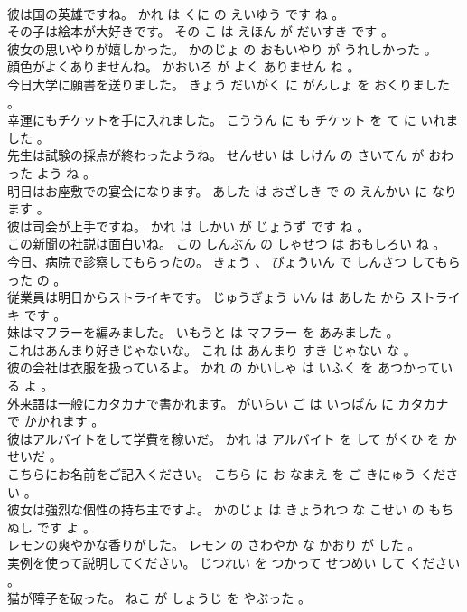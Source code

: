 \documentclass[8pt]{extreport}
\begin{document}
\begin{CJK}{UTF8}{min}
\\	彼は国の英雄ですね。	かれ は くに の えいゆう です ね 。 
\\	その子は絵本が大好きです。	その こ は えほん が だいすき です 。 
\\	彼女の思いやりが嬉しかった。	かのじょ の おもいやり が うれしかった 。 
\\	顔色がよくありませんね。	かおいろ が よく ありません ね 。 
\\	今日大学に願書を送りました。	きょう だいがく に がんしょ を おくりました 。 
\\	幸運にもチケットを手に入れました。	こううん に も チケット を て に いれました 。 
\\	先生は試験の採点が終わったようね。	せんせい は しけん の さいてん が おわった よう ね 。 
\\	明日はお座敷での宴会になります。	あした は おざしき で の えんかい に なります 。 
\\	彼は司会が上手ですね。	かれ は しかい が じょうず です ね 。 
\\	この新聞の社説は面白いね。	この しんぶん の しゃせつ は おもしろい ね 。 
\\	今日、病院で診察してもらったの。	きょう 、 びょういん で しんさつ してもらった の 。 
\\	従業員は明日からストライキです。	じゅうぎょう いん は あした から ストライキ です 。 
\\	妹はマフラーを編みました。	いもうと は マフラー を あみました 。 
\\	これはあんまり好きじゃないな。	これ は あんまり すき じゃない な 。 
\\	彼の会社は衣服を扱っているよ。	かれ の かいしゃ は いふく を あつかっている よ 。 
\\	外来語は一般にカタカナで書かれます。	がいらい ご は いっぱん に カタカナ で かかれます 。 
\\	彼はアルバイトをして学費を稼いだ。	かれ は アルバイト を して がくひ を かせいだ 。 
\\	こちらにお名前をご記入ください。	こちら に お なまえ を ご きにゅう ください 。 
\\	彼女は強烈な個性の持ち主ですよ。	かのじょ は きょうれつ な こせい の もちぬし です よ 。 
\\	レモンの爽やかな香りがした。	レモン の さわやか な かおり が した 。 
\\	実例を使って説明してください。	じつれい を つかって せつめい して ください 。 
\\	猫が障子を破った。	ねこ が しょうじ を やぶった 。 

\end{CJK}
\end{document}
